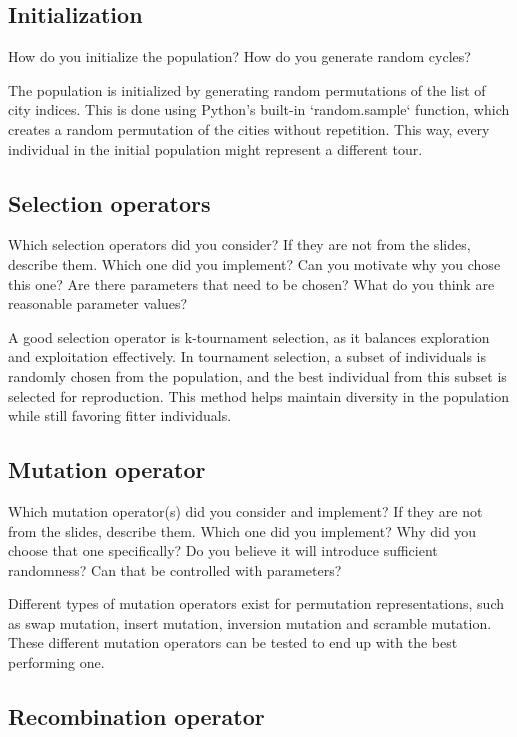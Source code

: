 \documentclass[a4paper,10pt]{article}
\newcommand{\ReplaceMe}[1]{{\color{blue}#1}}
\begin{document}
\subsection{Initialization}

\ReplaceMe{How do you initialize the population? How do you generate random cycles?}

The population is initialized by generating random permutations of the list of city indices. This is done using Python's built-in `random.sample` function, which creates a random permutation of the cities without repetition. This way, every individual in the initial population might represent a different tour.

\subsection{Selection operators}

\ReplaceMe{Which selection operators did you consider? If they are not from the slides, describe them. Which one did you implement? Can you motivate why you chose this one? Are there parameters that need to be chosen? What do you think are reasonable parameter values?}

A good selection operator is k-tournament selection, as it balances exploration and exploitation effectively. In tournament selection, a subset of individuals is randomly chosen from the population, and the best individual from this subset is selected for reproduction. This method helps maintain diversity in the population while still favoring fitter individuals.

\subsection{Mutation operator}

\ReplaceMe{Which mutation operator(s) did you consider and implement? If they are not from the slides, describe them. Which one did you implement? Why did you choose that one specifically? Do you believe it will introduce sufficient randomness? Can that be controlled with parameters?}

Different types of mutation operators exist for permutation representations, such as swap mutation, insert mutation, inversion mutation and scramble mutation. These different mutation operators can be tested to end up with the best performing one.

\subsection{Recombination operator}
\end{document}
